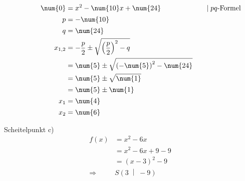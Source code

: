 \begin{exercise}
\begin{minipage}[t]{0.49\linewidth}
        \newcommand{\noeq}{\phantom{\Leftrightarrow}\vstrut&\quad}%
        \newcommand{\iseq}{\Leftrightarrow\vstrut&\quad}%
        \newcommand{\impl}{\Rightarrow\vstrut&\quad}%
        \newcommand{\nomod}{\quad&\phantom{|}}%
        \newcommand{\domod}[1]{\quad&|#1}%
        \begin{alignat*}{3}
          \noeq
          &
          \num{0}&=x^{2}-\num{10}x+\num{24}
          &
          \domod{\;\text{$pq$-Formel}}
          \\
          \noeq
          &
          p&=-\num{10}
          &
          \nomod
          \\
          \noeq
          &
          q&=\num{24}
          &
          \nomod
          \\
          \noeq
          &
          x_{1,2}&=-\frac{p}{2}\pm\sqrt{\left(\frac{p}{2}\right)^2-q}
          &
          \nomod
          \\
          \noeq
          &
          &=\num{5}\pm\sqrt{\left(-\num{5}\right)^2-\num{24}}
          &
          \nomod
          \\
          \noeq
          &
          &=\num{5}\pm\sqrt{\num{1}}
          &
          \nomod
          \\
          \noeq
          &
          &=\num{5}\pm\num{1}
          &
          \nomod
          \\
          \noeq
          &
          x_1&=\num{4}
          &
          \nomod
          \\
          \noeq
          &
          x_2&=\num{6}
          &
          \nomod
        \end{alignat*}
      \endgroup
    \end{minipage}\bigskip\par
    \begin{minipage}[t]{0.49\linewidth}
      Scheitelpunkt c)
      \small
      \begin{equation*}
        \begin{split}
          f(x)&=x^{2}-6x
          \\
          &=x^{2}-6x+9-9
          \\
          &=(x-3)^2-9
          \\[1ex]
          \Rightarrow\quad&S\left(3\;\middle|\;-9\right)
        \end{split}
      \end{equation*}
    \end{minipage}%
    \hfill

\end{exercise}
